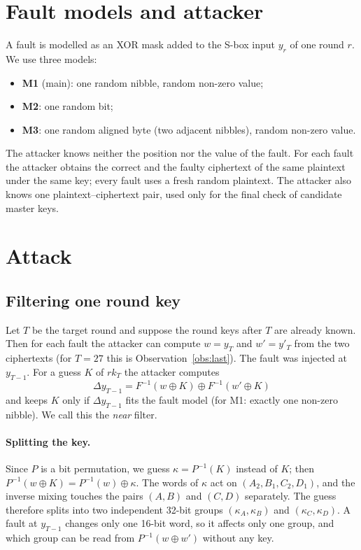 \documentclass[11pt,a4paper]{article}
\newcommand{\rk}{\mathit{rk}}
\newcommand{\Finv}{F^{-1}}
\begin{document}
\section{Fault models and attacker}

A fault is modelled as an XOR mask added to the S-box input $y_r$ of one round $r$. We use
three models:
\begin{itemize}
\item \textbf{M1} (main): one random nibble, random non-zero value;
\item \textbf{M2}: one random bit;
\item \textbf{M3}: one random aligned byte (two adjacent nibbles), random non-zero value.
\end{itemize}
The attacker knows neither the position nor the value of the fault. For each fault the
attacker obtains the correct and the faulty ciphertext of the same plaintext under the same
key; every fault uses a fresh random plaintext. The attacker also knows one plaintext--ciphertext
pair, used only for the final check of candidate master keys.

\section{Attack}\label{sec:attack}

\subsection{Filtering one round key}

Let $T$ be the target round and suppose the round keys after $T$ are already known. Then for
each fault the attacker can compute $w = y_T$ and $w' = y'_T$ from the two ciphertexts
(for $T=27$ this is Observation~\ref{obs:last}). The fault was injected at $y_{T-1}$. For a guess
$K$ of $\rk_T$ the attacker computes
\[
\Delta y_{T-1} = \Finv(w\oplus K)\oplus \Finv(w'\oplus K)
\]
and keeps $K$ only if $\Delta y_{T-1}$ fits the fault model (for M1: exactly one non-zero
nibble). We call this the \emph{near} filter.

\paragraph{Splitting the key.} Since $P$ is a bit permutation, we guess
$\kappa = P^{-1}(K)$ instead of $K$; then $P^{-1}(w\oplus K) = P^{-1}(w)\oplus\kappa$. The words of
$\kappa$ act on $(A_2,B_1,C_2,D_1)$, and the inverse mixing touches the pairs $(A,B)$ and $(C,D)$
separately. The guess therefore splits into two independent 32-bit groups $(\kappa_A,\kappa_B)$
and $(\kappa_C,\kappa_D)$. A fault at $y_{T-1}$ changes only one 16-bit word, so it affects only
one group, and which group can be read from $P^{-1}(w\oplus w')$ without any key.
\end{document}

